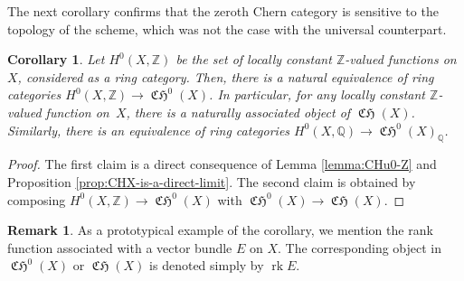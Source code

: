 \documentclass[JEP,XML,SOM,Unicode,published]{cedram}
\theoremstyle{plain}
\newtheorem{corollary}[theorem]{Corollary}
\theoremstyle{definition}
\newtheorem{remark}[theorem]{Remark}
\newcommand{\QBbb}{\mathbb Q}
\newcommand{\ZBbb}{\mathbb Z}
\DeclareMathOperator{\CHfrak}{\mathfrak{CH}}
\DeclareMathOperator{\rk}{rk}
\begin{document}
The next corollary confirms that the zeroth Chern category is sensitive to the topology of the scheme, which was not the case with the universal counterpart.

\begin{corollary}\label{cor:CH0-H0}
Let $H^{0}(X,\ZBbb)$ be the set of locally constant $\ZBbb$-valued functions on~$X$, considered as a ring category. Then, there is a natural equivalence of ring categories $H^{0}(X,\ZBbb)\to\CHfrak^{0}(X)$. In particular, for any locally constant $\ZBbb$-valued function on~$X$, there is a naturally associated object of $\CHfrak(X)$. Similarly, there is an equivalence of ring categories $H^{0}(X,\QBbb)\to\CHfrak^{0}(X)_{\QBbb}$.
\end{corollary}
\begin{proof}
The first claim is a direct consequence of Lemma \ref{lemma:CHu0-Z} and Proposition \ref{prop:CHX-is-a-direct-limit}. The second claim is obtained by composing $H^{0}(X,\ZBbb)\to \CHfrak^{0}(X)$ with $\CHfrak^{0}(X)\to\CHfrak(X)$.
\end{proof}

\begin{remark}
As a prototypical example of the corollary, we mention the rank function associated with a vector bundle $E$ on $X$. The corresponding object in $\CHfrak^{0}(X)$ or $\CHfrak(X)$ is denoted simply by $\rk E$.
\end{remark}
\end{document}
